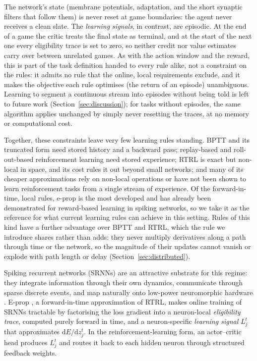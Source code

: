 \documentclass[10pt,twocolumn]{article}
\begin{document}
The network's state (membrane potentials, adaptation, and the short synaptic
filters that follow them) is never reset at game boundaries: the agent never
receives a clean slate. The \emph{learning signals}, in contrast, are episodic.
At the end of a game the critic treats the final state as terminal, and at the
start of the next one every eligibility trace is set to zero, so neither credit
nor value estimates carry over between unrelated games. As with the action
window and the reward, this is part of the task definition handed to every
rule alike, not a constraint on the rules: it admits no rule that the online,
local requirements exclude, and it makes the objective each rule optimises (the
return of an episode) unambiguous. Learning to segment a continuous stream into
episodes without being told is left to future work
(Section~\ref{sec:discussion}); for tasks without episodes, the same algorithm
applies unchanged by simply never resetting the traces, at no memory or
computational cost.

Together, these constraints leave very few learning rules standing. BPTT and
its truncated form need stored history and a backward pass; replay-based and
roll-out-based reinforcement learning need stored experience; RTRL is exact
but non-local in space, and its cost rules it out beyond small networks; and many of its cheaper
approximations rely on non-local operations or have not been shown to learn
reinforcement tasks from a single stream of experience. Of the forward-in-time,
local rules, e-prop is the most developed and has already been demonstrated
for reward-based learning in spiking networks, so we take it as the reference
for what current learning rules can achieve in this setting. Rules of this kind
have a further advantage over BPTT and RTRL, which the rule we introduce shares
rather than adds: they never multiply derivatives along a path through time or
the network, so the magnitude of their updates cannot vanish or explode with
path length or delay (Section~\ref{sec:distributed}).

Spiking recurrent networks (SRNNs) are an attractive substrate for this
regime: they integrate information through their own dynamics, communicate
through sparse discrete events, and map naturally onto low-power neuromorphic
hardware \citep{Davies2018Loihi,Painkras2013SpiNNaker}. E-prop
\citep{eprop2020}, a forward-in-time approximation of RTRL, makes online
training of SRNNs tractable by factorising the loss gradient into a
neuron-local \emph{eligibility trace}, computed purely forward in time, and a
neuron-specific \emph{learning signal} $L^t_j$ that approximates
$\mathrm{d}E/\mathrm{d}z^t_j$. In the reinforcement-learning form, an
actor--critic head produces $L^t_j$ and routes it back to each hidden neuron
through structured feedback weights.
\end{document}
